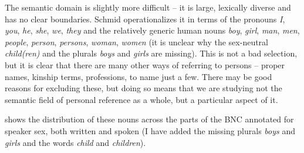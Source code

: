 The semantic  domain  is slightly more difficult -- it is large, lexically diverse and has no clear boundaries. Schmid operationalizes  it in terms of the pronouns  \textit{I}, \textit{you}, \textit{he}, \textit{she}, \textit{we}, \textit{they} and the relatively generic human nouns  \textit{boy}, \textit{girl}, \textit{man}, \textit{men}, \textit{people}, \textit{person}, \textit{persons}, \textit{woman}, \textit{women} (it is unclear why the sex\hyp{}neutral \textit{child(ren)} and the plurals  \textit{boys} and \textit{girls} are missing). This is not a bad selection, but it is clear that there are many other ways of referring to persons -- proper names, kinship terms, professions, to name just a few. There may be good reasons for excluding these, but doing so means that we are studying not the semantic  field of personal reference as a whole, but a particular aspect of it.

 shows the distribution  of these nouns  across the parts of the BNC  annotated  for speaker sex,  both written  and spoken (I have added the missing plurals \textit{boys} and \textit{girls} and the words \textit{child} and \textit{children}).

